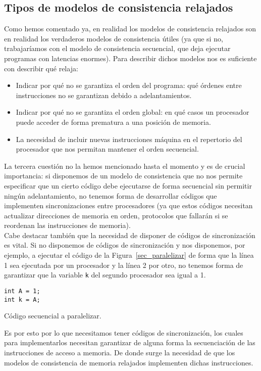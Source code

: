 \subsection{Tipos de modelos de consistencia relajados}
Como hemos comentado ya, en realidad los modelos de consistencia relajados son en realidad los verdaderos modelos de consistencia útiles (ya que si no, trabajaríamos con el modelo de consistencia secuencial, que deja ejecutar programas con latencias enormes). Para describir dichos modelos nos es suficiente con describir qué relaja:
\begin{itemize}
    \item Indicar por qué no se garantiza el orden del programa: qué órdenes entre instrucciones no se garantizan debido a adelantamientos.
    \item Indicar por qué no se garantiza el orden global: en qué casos un procesador puede acceder de forma prematura a una posición de memoria.
    \item La necesidad de incluir nuevas instrucciones máquina en el repertorio del procesador que nos permitan mantener el orden secuencial.
\end{itemize}
La tercera cuestión no la hemos mencionado hasta el momento y es de crucial importancia: si disponemos de un modelo de consistencia que no nos permite especificar que un cierto código debe ejecutarse de forma secuencial sin permitir ningún adelantamiento, no tenemos forma de desarrollar códigos que implementen sincronizaciones entre procesadores (ya que estos códigos necesitan actualizar direcciones de memoria en orden, protocolos que fallarán si se reordenan las instrucciones de memoria).\\

Cabe destacar también que la necesidad de disponer de códigos de sincronización es vital. Si no disponemos de códigos de sincronización y nos disponemos, por ejemplo, a ejecutar el código de la Figura~\ref{sec_paralelizar} de forma que la línea 1 sea ejecutada por un procesador y la línea 2 por otro, no tenemos forma de garantizar que la variable \verb|k| del segundo procesador sea igual a 1.
\begin{listing}[H]
    \centering
    \begin{verbatim}
int A = 1;
int k = A;
    \end{verbatim}
    \caption{Código secuencial a paralelizar.}
    \label{sec_paralelizar}
\end{listing}
Es por esto por lo que necesitamos tener códigos de sincronización, los cuales para implementarlos necesitan garantizar de alguna forma la secuenciación de las instrucciones de acceso a memoria. De donde surge la necesidad de que los modelos de consistencia de memoria relajados implementen dichas instrucciones.\\

